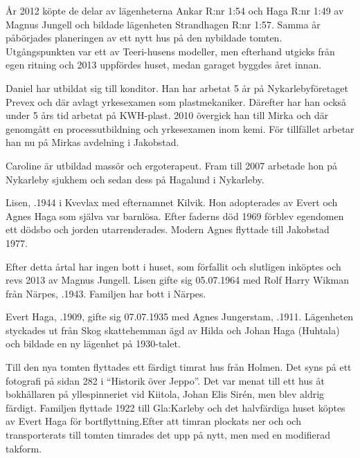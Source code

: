 År 2012 köpte de delar av lägenheterna Ankar R:nr 1:54 och Haga R:nr 1:49 av Magnus Jungell och bildade lägenheten Strandhagen R:nr 1:57. Samma år påbörjades planeringen av ett nytt hus på den nybildade tomten. Utgångspunkten var ett av Teeri-husens modeller, men efterhand utgicks från egen ritning och 2013 uppfördes huset, medan garaget byggdes året innan.

Daniel har utbildat sig till konditor. Han har arbetat 5 år på Nykarlebyföretaget Prevex och där avlagt yrkesexamen som plastmekaniker. Därefter har han också under 5 års tid arbetat på KWH-plast. 2010 övergick han till Mirka  och där genomgått en processutbildning och yrkesexamen inom kemi. För tillfället arbetar han nu på Mirkas avdelning i Jakobstad.

Caroline är utbildad massör och ergoterapeut. Fram till 2007 arbetade hon på Nykarleby sjukhem och sedan dess på Hagalund i Nykarleby.

\begin{jhchildren}
  \item {}
  \item {}
\end{jhchildren}




Lisen, .1944 i Kvevlax med efternamnet Kilvik. Hon adopterades av Evert och Agnes Haga som själva var barnlösa. Efter faderns död 1969 förblev egendomen ett dödsbo och jorden utarrenderades. Modern Agnes flyttade till Jakobstad 1977.

Efter detta årtal har ingen bott i huset, som förfallit och slutligen inköptes och revs 2013 av Magnus Jungell. Lisen gifte sig 05.07.1964 med Rolf Harry Wikman från Närpes, .1943. Familjen har bott i Närpes.



Evert Haga, .1909, gifte sig 07.07.1935  med Agnes Jungerstam, .1911. Lägenheten styckades ut från Skog skattehemman ägd av Hilda och Johan Haga (Huhtala) och bildade en  ny lägenhet på 1930-talet.

Till den nya tomten flyttades ett färdigt timrat hus från Holmen. Det syns på ett fotografi på sidan 282 i ``Historik över Jeppo''. Det var menat till ett hus åt bokhållaren på yllespinneriet vid Kiitola, Johan Elis Sirén, men blev aldrig färdigt. Familjen flyttade 1922 till Gla:Karleby och det halvfärdiga huset köptes av Evert Haga för bortflyttning.Efter att timran plockats ner och och transporterats till tomten timrades det upp på nytt, men med en modifierad takform.

